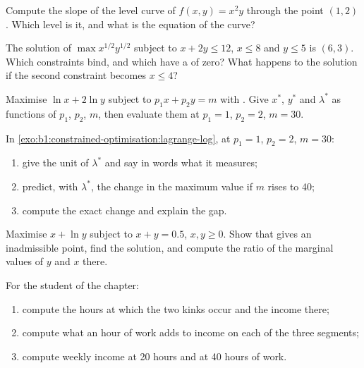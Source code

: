 \begin{exercise}[$\star$]\label{exo:b1:constrained-optimisation:level-slope}
Compute the slope of the level curve of $f(x, y) = x^2 y$ through the point
$(1, 2)$. Which level is it, and what is the equation of the curve?
\end{exercise}

\begin{exercise}[$\star$]\label{exo:b1:constrained-optimisation:binding}
The solution of $\max x^{1/2}y^{1/2}$ subject to $x + 2y \le 12$, $x \le 8$ and
$y \le 5$ is $(6, 3)$. Which constraints bind, and which have a 
of zero? What happens to the solution if the second constraint becomes
$x \le 4$?
\end{exercise}

\begin{exercise}[$\star\star$]\label{exo:b1:constrained-optimisation:lagrange-log}
Maximise $\ln x + 2\ln y$ subject to $p_1 x + p_2 y = m$ with . Give $x^*$, $y^*$ and $\lambda^*$ as functions of $p_1$, $p_2$, $m$, then
evaluate them at $p_1 = 1$, $p_2 = 2$, $m = 30$.
\end{exercise}

\begin{exercise}[$\star\star$]\label{exo:b1:constrained-optimisation:lambda-units}
In \cref{exo:b1:constrained-optimisation:lagrange-log}, at $p_1 = 1$,
$p_2 = 2$, $m = 30$:
\begin{enumerate}
  \item give the unit of $\lambda^*$ and say in words what it measures;
  \item predict, with $\lambda^*$, the change in the maximum value if $m$ rises to 40;
  \item compute the exact change and explain the gap.
\end{enumerate}
\end{exercise}

\begin{exercise}[$\star\star$]\label{exo:b1:constrained-optimisation:corner}
Maximise $x + \ln y$ subject to $x + y = 0.5$, $x, y \ge 0$. Show that
 gives an inadmissible point, find the solution, and
compute the ratio of the marginal values of $y$ and $x$ there.
\end{exercise}

\begin{exercise}[$\star\star$]\label{exo:b1:constrained-optimisation:student-kinks}
For the student of the chapter:
\begin{enumerate}
  \item compute the hours at which the two kinks occur and the income there;
  \item compute what an hour of work adds to income on each of the three segments;
  \item compute weekly income at 20 hours and at 40 hours of work.
\end{enumerate}
\end{exercise}

